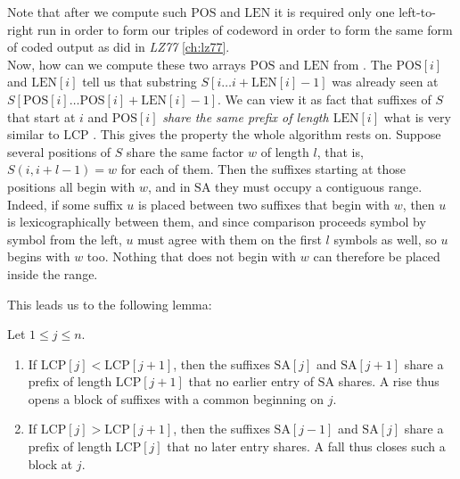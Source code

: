 Note that after we compute such \(\mathrm{POS}\) and \(\mathrm{LEN}\) it is required only one left-to-right run in order to form our triples of codeword in order to form the same form of coded output as did in \emph{LZ77} \cref{ch:lz77}.
\\

Now, how can we compute these two arrays \(\mathrm{POS}\) and \(\mathrm{LEN}\) from . The \(\mathrm{POS}[i]\) and \(\mathrm{LEN}[i]\) tell us that substring \(S[i \ldots i + \mathrm{LEN}[i] - 1]\) was already seen at \(S[\mathrm{POS}[i] \ldots \mathrm{POS}[i] + \mathrm{LEN}[i] - 1]\). We can view it as fact that suffixes of \(S\) that start at \(i\) and \(\mathrm{POS}[i]\) \emph{share the same prefix of length \(\mathrm{LEN}[i]\)} what is very similar to \(\mathrm{LCP}\) . This gives the property the whole algorithm rests on. Suppose several positions of \(S\) share the same factor \(w\) of length \(l\), that is, \(S(i, i + l - 1) = w\) for each of them. Then the suffixes starting at those positions all begin with \(w\), and in \(\mathrm{SA}\) they must occupy a contiguous range. Indeed, if some suffix \(u\) is placed between two suffixes that begin with \(w\), then \(u\) is lexicographically between them, and since comparison proceeds symbol by symbol from the left, \(u\) must agree with them on the first \(l\) symbols as well, so \(u\) begins with \(w\) too. Nothing that does not begin with \(w\) can therefore be placed inside the range.

This leads us to the following lemma:
\begin{lemma}
\label{lem:rises-falls}
    Let \(1 \leq j \leq n\).
    \begin{enumerate}[label=(O\arabic*)]
        \item \label{cps-obs:rise}  If \(\mathrm{LCP}[j] < \mathrm{LCP}[j+1]\), then the suffixes \(\mathrm{SA}[j]\) and \(\mathrm{SA}[j+1]\) share a prefix of length \(\mathrm{LCP}[j+1]\) that no earlier entry of \(\mathrm{SA}\) shares. A rise thus opens a block of suffixes with a common beginning on \(j\). 
        \item \label{cps-obs:fall}If \(\mathrm{LCP}[j] > \mathrm{LCP}[j+1]\), then the suffixes \(\mathrm{SA}[j-1]\) and \(\mathrm{SA}[j]\) share a prefix of length \(\mathrm{LCP}[j]\) that no later entry shares. A fall thus closes such a block at \(j\).
    \end{enumerate}
\end{lemma}

